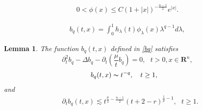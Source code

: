\documentclass[10pt,a4paper]{amsart}
\newtheorem{lem}{Lemma}
\newcommand{\R}{\mathbf{R}}
\begin{document}
\begin{equation}\label{testpro}
\begin{aligned}
0<\phi(x)\le C(1+|x|)^{-\frac{n-1}{2}}e^{|x|}.
\end{aligned}
\end{equation}

\begin{equation}\label{bq}
\begin{aligned}
b_q(t,x)=\int_{0}^{1}h_\lambda(t)\phi_{\lambda}(x)\lambda^{q-1}d\lambda,
\end{aligned}
\end{equation}

\begin{lem}\label{lbq}
The function $b_q(t, x)$ defined in \eqref{bq} satisfies
\begin{equation}\label{eqforbq}
\partial_t^2b_q-\Delta b_q-\partial_t\left(\frac{\mu}{t}b_q\right)=0,~~~t>0, x\in\R^n,
\end{equation}
\begin{equation}\label{asymforbq}
\begin{aligned}
&b_q(t, x)\thicksim t^{-q},~~~t\ge 1,
\end{aligned}
\end{equation}
and
\begin{equation}\label{asymfortbq}
\begin{aligned}
&\partial_t b_q(t, x)\lesssim t^{\frac{\mu}{2}-\frac{n-1}{2}}(t+2-r)^{\frac{1}{p}-1},~~~t\ge 1.
\end{aligned}
\end{equation}
\end{lem}
\end{document}
